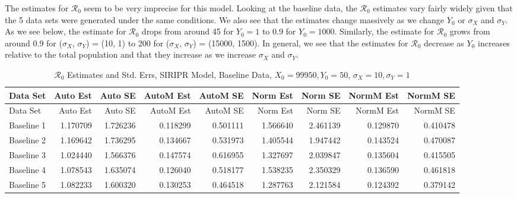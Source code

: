 \documentclass[12pt]{article}
\newcommand{\rr}{\ensuremath{\mathcal{R}_0}}
\begin{document}
The estimates for $\rr$ seem to be very imprecise for this model. Looking at the baseline data, the $\rr$ estimates vary fairly widely given that the 5 data sets were generated under the same conditions. We also see that the estimates change massively as we change $Y_0$ or $\sigma_X$ and $\sigma_Y$. As we see below, the estimate for $\rr$ drops from around 45 for $Y_0 = 1$ to 0.9 for $Y_0 = 1000$. Similarly, the estimate for $\rr$ grows from around 0.9 for ($\sigma_X$, $\sigma_Y$) = (10, 1) to 200 for ($\sigma_X$, $\sigma_Y$) = (15000, 1500). In general, we see that the estimates for $\rr$ decrease as $Y_0$ increases relative to the total population and that they increase as we increase 
$\sigma_X$ and $\sigma_Y$.

\begin{table}[H]
	
	\caption{$\rr$ Estimates and Std. Errs, SIRIPR Model,
		Baseline Data, $X_0 = 99950, Y_0 = 50$, 
		$\sigma_X = 10, \sigma_Y = 1$}
	\begin{footnotesize}
		\hskip -1cm
		\begin{tabular}{l|r|r|r|r|r|r|r|r}
			\hline
			Data Set & Auto Est & Auto SE & AutoM Est & AutoM SE & Norm Est & Norm SE & NormM Est & NormM SE\\
			\hline
			Data Set & Auto Est & Auto SE & AutoM Est & AutoM SE & Norm Est & Norm SE & NormM Est & NormM SE\\
			\hline
			Baseline 1 & 1.170709 & 1.726236 & 0.118299 & 0.501111 & 1.566640 & 2.461139 & 0.129870 & 0.410478\\
			\hline
			Baseline 2 & 1.169642 & 1.736295 & 0.134667 & 0.531973 & 1.405544 & 1.947442 & 0.143524 & 0.470087\\
			\hline
			Baseline 3 & 1.024440 & 1.566376 & 0.147574 & 0.616955 & 1.327697 & 2.039847 & 0.135604 & 0.415505\\
			\hline
			Baseline 4 & 1.078543 & 1.635074 & 0.126040 & 0.518177 & 1.538235 & 2.350329 & 0.136590 & 0.461818\\
			\hline
			Baseline 5 & 1.082233 & 1.600320 & 0.130253 & 0.464518 & 1.287763 & 2.121584 & 0.124392 & 0.379142\\
			\hline
		\end{tabular}
	\end{footnotesize}
\end{table}
\end{document}
